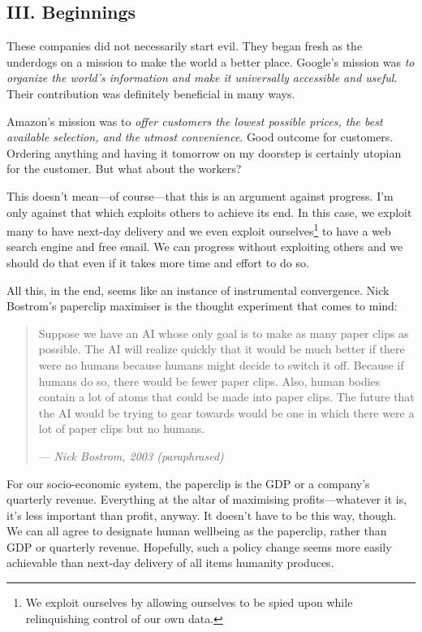 \subsection{III. Beginnings}

These companies did not necessarily start evil. They began fresh as the underdogs on a mission to make the world a better place. Google’s mission was \emph{to organize the world’s information and make it universally accessible and useful}. Their contribution was definitely beneficial in many ways.

Amazon’s mission was to \emph{offer customers the lowest possible prices, the best available selection, and the utmost convenience}. Good outcome for customers. Ordering anything and having it tomorrow on my doorstep is certainly utopian for the customer. But what about the workers?

This doesn’t mean—of course—that this is an argument against progress. I’m only against that which exploits others to achieve its end. In this case, we exploit many to have next-day delivery and we even exploit ourselves\footnote{We exploit ourselves by allowing ourselves to be spied upon while relinquishing control of our own data.} to have a web search engine and free email. We can progress without exploiting others and we should do that even if it takes more time and effort to do so.

All this, in the end, seems like an instance of instrumental convergence. Nick Bostrom’s paperclip maximiser is the thought experiment that comes to mind:

\begin{quote}
    Suppose we have an AI whose only goal is to make as many paper clips as possible. The AI will realize quickly that it would be much better if there were no humans because humans might decide to switch it off. Because if humans do so, there would be fewer paper clips. Also, human bodies contain a lot of atoms that could be made into paper clips. The future that the AI would be trying to gear towards would be one in which there were a lot of paper clips but no humans.

    — \emph{Nick Bostrom, 2003 (paraphrased)}
\end{quote}

For our socio-economic system, the paperclip is the GDP or a company’s quarterly revenue. Everything at the altar of maximising profits—whatever it is, it’s less important than profit, anyway. It doesn’t have to be this way, though. We can all agree to designate human wellbeing as the paperclip, rather than GDP or quarterly revenue. Hopefully, such a policy change seems more easily achievable than next-day delivery of all items humanity produces.

